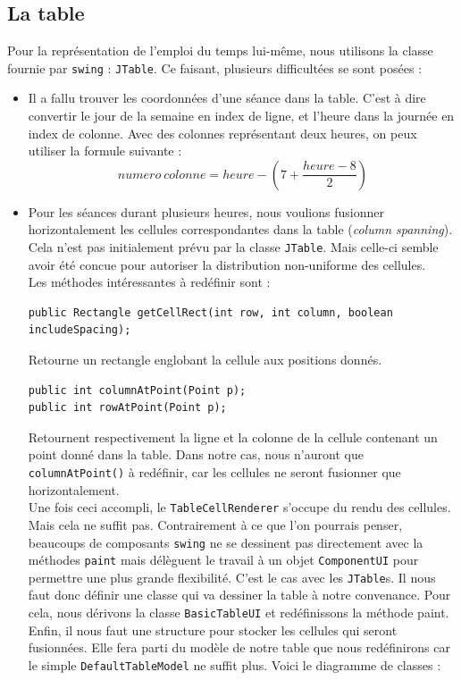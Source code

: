 \documentclass{article}
\begin{document}
\newpage
\subsection{La table}
Pour la représentation de l'emploi du temps lui-même, nous utilisons la classe fournie par \texttt{swing} : \texttt{JTable}. Ce faisant, plusieurs difficultées se sont posées :
\begin{itemize}
\item Il a fallu trouver les coordonnées d'une séance dans la table. C'est à dire convertir le jour de la semaine en index de ligne, et l'heure dans la journée en index de colonne.
Avec des colonnes représentant deux heures, on peux utiliser la formule suivante :
\[numero\ colonne = heure - (7 + \frac{heure - 8}{2})\]
\item Pour les séances durant plusieurs heures, nous voulions fusionner horizontalement les cellules correspondantes dans la table (\textit{column spanning}).
Cela n'est pas initialement prévu par la classe \texttt{JTable}. Mais celle-ci semble avoir été concue pour autoriser la distribution non-uniforme des cellules.\\
Les méthodes intéressantes à redéfinir sont :
\begin{verbatim}
public Rectangle getCellRect(int row, int column, boolean includeSpacing);
\end{verbatim}
Retourne un rectangle englobant la cellule aux positions donnés.
\begin{verbatim}
public int columnAtPoint(Point p);
public int rowAtPoint(Point p);
\end{verbatim}
Retournent respectivement la ligne et la colonne de la cellule contenant un point donné dans la table. Dans notre cas, nous n'auront que \texttt{columnAtPoint()} à redéfinir, car les cellules ne seront fusionner que horizontalement.\\
Une fois ceci accompli, le \texttt{TableCellRenderer} s'occupe du rendu des cellules. \\
Mais cela ne suffit pas. Contrairement à ce que l'on pourrais penser, beaucoups de composants \texttt{swing} ne se dessinent pas directement avec la méthodes \texttt{paint} mais délèguent le travail à un objet \texttt{ComponentUI} pour permettre une plus grande flexibilité. C'est le cas avec les \texttt{JTable}s. Il nous faut donc définir une classe qui va dessiner la table à notre convenance. Pour cela, nous dérivons la classe \texttt{BasicTableUI} et redéfinissons la méthode paint. \\
Enfin, il nous faut une structure pour stocker les cellules qui seront fusionnées. Elle fera parti du modèle de notre table que nous redéfinirons car le simple \texttt{DefaultTableModel} ne suffit plus.
Voici le diagramme de classes :


\end{itemize}
\end{document}
